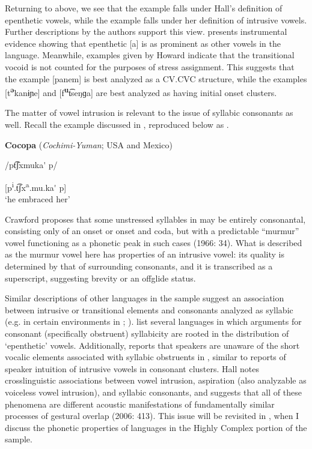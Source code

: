   Returning to  above, we see that the  example falls under Hall’s definition of epenthetic vowels, while the  example falls under her definition of intrusive vowels. Further descriptions by the authors support this view. \citet[36]{Dol2007} presents instrumental evidence showing that epenthetic [a] is as prominent as other vowels in the language. Meanwhile, examples given by Howard indicate that the transitional vocoid is not counted for the purposes of stress assignment. This suggests that the  example [panem] is best analyzed as a CV.CVC structure, while the  examples [t\textbf{\textsuperscript{ə}}kanɨɲe] and [f\textbf{\textsuperscript{u}}t͡seŋɡa] are best analyzed as having initial onset clusters.

  The matter of vowel intrusion is relevant to the issue of syllabic consonants as well. Recall the  example discussed in , reproduced below as .

\ea\label{ex:3.10}
  \textbf{Cocopa} (\textit{Cochimi-Yuman}; USA and Mexico)

/pt͡ʃxmuka\'{} p/

[p\textsuperscript{i}.t͡ʃx\textsuperscript{a}.mu.ka\'{} p]\\
\glt ‘he embraced her’
\citep[43]{Crawford1966}
\z

Crawford proposes that some unstressed syllables in  may be entirely consonantal, consisting only of an onset or onset and coda, but with a predictable ``murmur'' vowel functioning as a phonetic peak in such cases (1966: 34). What is described as the murmur vowel here has properties of an intrusive vowel: its quality is determined by that of surrounding consonants, and it is transcribed as a superscript, suggesting brevity or an offglide status.

  Similar descriptions of other languages in the sample suggest an association between intrusive or transitional elements and consonants analyzed as syllabic (e.g. in certain environments in ; \citealt{DellElmedlaoui2002}). \citet{HargusBeavert2006} list several languages in which arguments for consonant (specifically obstruent) syllabicity are rooted in the distribution of ‘epenthetic’ vowels. Additionally, \citet[185-186]{Bell1978a} reports that speakers are unaware of the short vocalic elements associated with syllabic obstruents in , similar to reports of speaker intuition of intrusive vowels in consonant clusters. Hall notes crosslinguistic associations between vowel intrusion, aspiration (also analyzable as voiceless vowel intrusion), and syllabic consonants, and suggests that all of these phenomena are different acoustic manifestations of fundamentally similar processes of gestural overlap (2006: 413). This issue will be revisited in , when I discuss the phonetic properties of languages in the Highly Complex portion of the sample.

